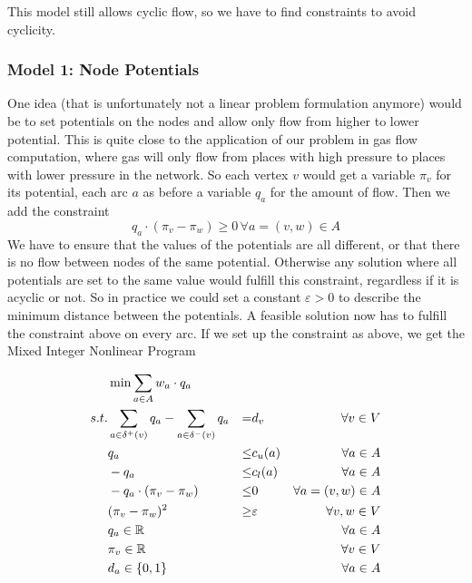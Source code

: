 This model still allows cyclic flow, so we have to find constraints to avoid cyclicity. 
\subsubsection{Model 1: Node Potentials}
\label{model:nodePotential}

One idea (that is unfortunately not a linear problem formulation anymore) would be to set potentials on the nodes and 
allow only flow from higher to lower potential. This is quite close to the application of our problem in gas flow 
computation, where gas will only flow from places with high pressure to places with lower pressure in the network. So 
each vertex $v$ would get a variable $\pi_v$ for its potential, each arc $a$ as before a variable $q_a$ for the amount 
of flow. Then we add the constraint $$q_a\cdot (\pi_v -\pi_w)\ge 0\,\forall a=(v,w)\in A $$
We have to ensure that the values of the potentials are all 
different, or that there is no flow between nodes of the same potential. Otherwise any solution where all potentials 
are set to the same value would fulfill this constraint, regardless if it is acyclic or not. So in practice we could 
set a constant $\varepsilon > 0$ to describe the minimum distance between the potentials. A feasible 
solution now has to fulfill the constraint above on every arc. If we set up the constraint as above, we get the Mixed 
Integer Nonlinear Program

\begin{align*}\label{model:nodePotentialQuadratic}
  &\min \sum_{a\in A} w_a\cdot q_a & \\
 s.t. & \sum_{a\in \delta^+(v)}q_a - \sum_{a\in\delta^- (v)}q_a &=& d_v\ &\forall v\in V \\
 & q_a &\le& c_u(a) & \forall a\in A\\
 & -q_a &\le& c_l(a) & \forall a\in A\\
 & -q_a\cdot (\pi_v -\pi_w)&\le& 0 &\forall a=(v,w)\in A\\
 & (\pi_v - \pi_w)^2 &\ge& \varepsilon &\forall v,w \in V\\
 & q_a \in \mathbb{R} & & &\forall a\in A\\
 & \pi_v \in \mathbb{R} & & & \forall v\in V\\
 & d_a \in \{0,1\} & & &\forall a\in A\\
\end{align*}

